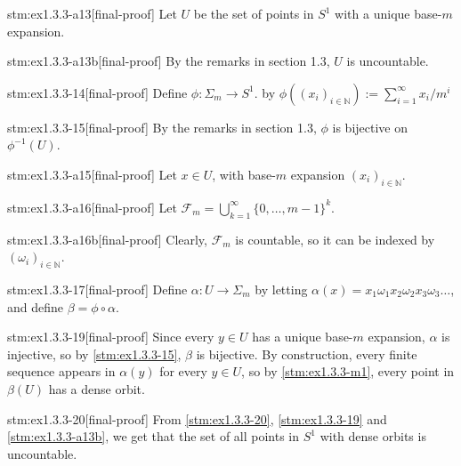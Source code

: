 \begin{stm}{stm:ex1.3.3-a13}[final-proof]
Let $U$ be the set of points in $S^1$ with a unique base-$m$ expansion. 
\end{stm}

\begin{stm}{stm:ex1.3.3-a13b}[final-proof]
By the remarks in section 1.3, $U$ is uncountable.
\end{stm}

\begin{stm}{stm:ex1.3.3-14}[final-proof]
Define $\phi : \Sigma_m \to S^1$. by $\phi((x_i)_{i \in \mathbb{N}}) := \sum_{i=1}^\infty x_i / m^i$
\end{stm}

\begin{stm}{stm:ex1.3.3-15}[final-proof]
By the remarks in section 1.3, $\phi$ is bijective on $\phi^{-1}(U)$.
\end{stm}{}

\begin{stm}{stm:ex1.3.3-a15}[final-proof]
Let $x \in U$, with base-$m$ expansion $(x_i)_{i \in \mathbb{N}}$.
\end{stm}

\begin{stm}{stm:ex1.3.3-a16}[final-proof]
Let $\mathcal{F}_m = \bigcup_{k=1}^\infty \{0, \dots, m-1\}^k$.
\end{stm}

\begin{stm}{stm:ex1.3.3-a16b}[final-proof]
Clearly, $\mathcal{F}_m$ is countable, so it can be indexed by $(\omega_i)_{i \in \mathbb{N}}$.
\end{stm}

\begin{stm}{stm:ex1.3.3-17}[final-proof]
Define $\alpha : U \to \Sigma_m$ by letting $\alpha(x) = x_1 \omega_1 x_2 \omega_2 x_3 \omega_3 \dots$, and define $\beta = \phi \circ \alpha$.
\end{stm}

\begin{stm}{stm:ex1.3.3-19}[final-proof]
Since every $y \in U$ has a unique base-$m$ expansion, $\alpha$ is injective, so by \ref{stm:ex1.3.3-15}, $\beta$ is bijective. By construction, every finite sequence appears in $\alpha(y)$ for every $y \in U$, so by \ref{stm:ex1.3.3-m1}, every point in $\beta(U)$ has a dense orbit.
\end{stm}

\begin{stm}{stm:ex1.3.3-20}[final-proof]
From \ref{stm:ex1.3.3-20}, \ref{stm:ex1.3.3-19} and \ref{stm:ex1.3.3-a13b}, we get that the set of all points in $S^1$ with dense orbits is uncountable.
\end{stm}
